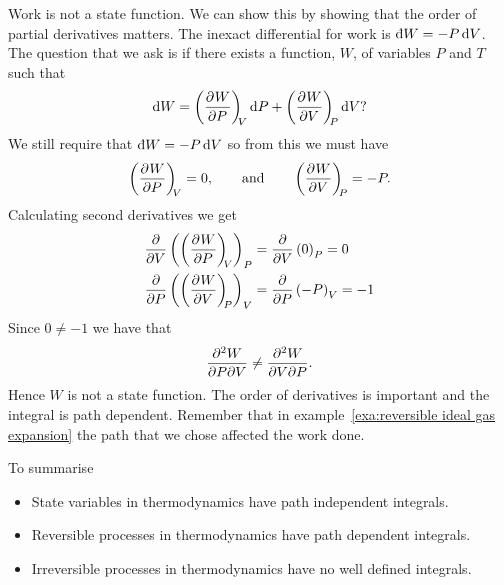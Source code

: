     Work is not a state function.
    We can show this by showing that the order of partial derivatives matters.
    The inexact differential for work is \(\ddbar{W} = -P\dd{V}\).
    The question that we ask is if there exists a function, \(W\), of variables \(P\) and \(T\) such that
    \[\dd{W} = \left(\pdv[]{W}{P}\right)_{\!\!{V}}\dd{P} + \left(\pdv[]{W}{V}\right)_{\!\!{P}}\dd{V}?\]
    We still require that \(\ddbar{W} = -P\dd{V}\) so from this we must have
    \[\left(\pdv[]{W}{P}\right)_{\!\!{V}} = 0,\qquad\text{and}\qquad \left(\pdv[]{W}{V}\right)_{\!\!{P}} = -P.\]
    Calculating second derivatives we get
    \begin{align*}
        \pdv{V}\left(\left(\pdv[]{W}{P}\right)_{\!\!{V}}\right)_{P} &= \pdv{V}\left(0\right)_{P} = 0\\
        \pdv{P}\left(\left(\pdv[]{W}{V}\right)_{\!\!{P}}\right)_{V} &= \pdv{P}\left(-P\right)_{V} = -1
    \end{align*}
    Since \(0 \ne -1\) we have that
    \[\frac{\partial^2{W}}{\partial{P}\partial{V}} \ne \frac{\partial^2{W}}{\partial{V}\partial{P}}.\]
    Hence \(W\) is not a state function.
    The order of derivatives is important and the integral is path dependent.
    Remember that in example~\ref{exa:reversible ideal gas expansion} the path that we chose affected the work done.
    
    To summarise
    \begin{itemize}
        \item State variables in thermodynamics have path independent integrals.
        \item Reversible processes in thermodynamics have path dependent integrals.
        \item Irreversible processes in thermodynamics have no well defined integrals.
    \end{itemize}
    
